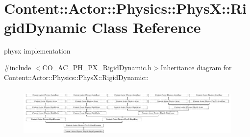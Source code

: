 \hypertarget{classContent_1_1Actor_1_1Physics_1_1PhysX_1_1RigidDynamic}{
\section{Content::Actor::Physics::PhysX::RigidDynamic Class Reference}
\label{classContent_1_1Actor_1_1Physics_1_1PhysX_1_1RigidDynamic}
}


physx implementation  


{\ttfamily \#include $<$CO\_\-AC\_\-PH\_\-PX\_\-RigidDynamic.h$>$}Inheritance diagram for Content::Actor::Physics::PhysX::RigidDynamic::\begin{figure}[H]
\begin{center}
\leavevmode
\includegraphics[height=2.63973cm]{classContent_1_1Actor_1_1Physics_1_1PhysX_1_1RigidDynamic}
\end{center}
\end{figure}
